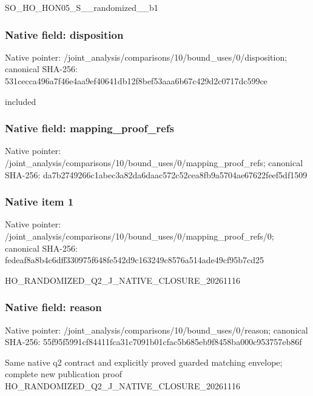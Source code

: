 \documentclass[10pt,a4paper]{article}
\begin{document}
\begingroup\raggedright\sloppy SO\_\allowbreak{}HO\_\allowbreak{}HON05\_\allowbreak{}S\_\allowbreak{}\_\allowbreak{}randomized\_\allowbreak{}\_\allowbreak{}b1\par\endgroup

\subsubsection{Native field: disposition}
Native pointer: /joint\_\allowbreak{}analysis/comparisons/10/bound\_\allowbreak{}uses/0/disposition; canonical SHA-256: 531cecca496a7f46e4aa9ef40641db12f8bef53aaa6b67c429d2c0717dc599ce

\begingroup\raggedright\sloppy included\par\endgroup

\subsubsection{Native field: mapping\_\allowbreak{}proof\_\allowbreak{}refs}
Native pointer: /joint\_\allowbreak{}analysis/comparisons/10/bound\_\allowbreak{}uses/0/mapping\_\allowbreak{}proof\_\allowbreak{}refs; canonical SHA-256: da7b2749266c1abec3a82da6daac572c52cea8fb9a5704ae67622feef5df1509

\subsubsection{Native item 1}
Native pointer: /joint\_\allowbreak{}analysis/comparisons/10/bound\_\allowbreak{}uses/0/mapping\_\allowbreak{}proof\_\allowbreak{}refs/0; canonical SHA-256: fedeaf8a8b4c6dff330975f648fe542d9c163249c8576a514ade49cf95b7cd25

\begingroup\raggedright\sloppy HO\_\allowbreak{}RANDOMIZED\_\allowbreak{}Q2\_\allowbreak{}J\_\allowbreak{}NATIVE\_\allowbreak{}CLOSURE\_\allowbreak{}20261116\par\endgroup

\subsubsection{Native field: reason}
Native pointer: /joint\_\allowbreak{}analysis/comparisons/10/bound\_\allowbreak{}uses/0/reason; canonical SHA-256: 55f95f5991cf84411fca31c7091b01cfac5b685eb9f8458ba000c953757eb86f

\begingroup\raggedright\sloppy Same native q2 contract and explicitly proved guarded matching envelope;\allowbreak{} complete new publication proof HO\_\allowbreak{}RANDOMIZED\_\allowbreak{}Q2\_\allowbreak{}J\_\allowbreak{}NATIVE\_\allowbreak{}CLOSURE\_\allowbreak{}20261116\par\endgroup
\end{document}
